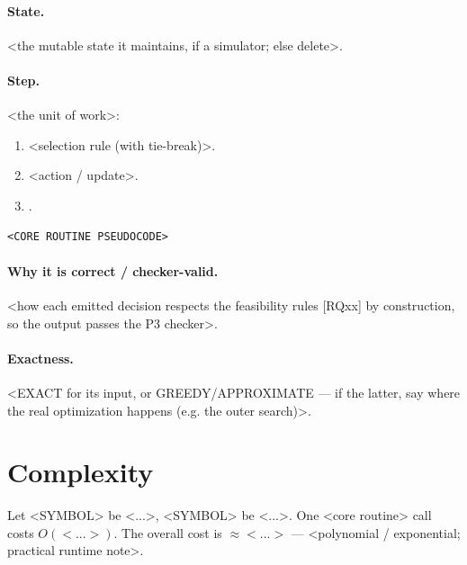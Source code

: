 \paragraph{State.} <the mutable state it maintains, if a simulator; else delete>.

\paragraph{Step.} <the unit of work>:
\begin{enumerate}
  \item <selection rule (with tie-break)>.
  \item <action / update>.
  \item <what gets recorded, what advances>.
\end{enumerate}

\begin{verbatim}
<CORE ROUTINE PSEUDOCODE>
\end{verbatim}

\paragraph{Why it is correct / checker-valid.} <how each emitted decision
respects the feasibility rules [RQxx] by construction, so the output passes the
P3 checker>.

\paragraph{Exactness.} <EXACT for its input, or GREEDY/APPROXIMATE — if the
latter, say where the real optimization happens (e.g. the outer search)>.

\section{Complexity}
Let <SYMBOL> be <...>, <SYMBOL> be <...>. One <core routine> call costs
$O(<...>)$. The overall cost is
$\approx <...>$ --- <polynomial / exponential; practical runtime note>.

